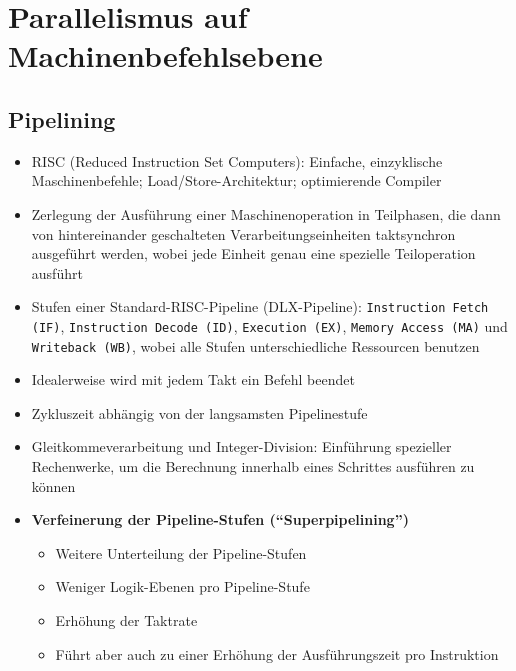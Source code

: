 \section{Parallelismus auf Machinenbefehlsebene}

\subsection{Pipelining}
\begin{itemize}
	\item RISC (Reduced Instruction Set Computers): Einfache, einzyklische Maschinenbefehle; Load/Store-Architektur; optimierende Compiler
	\item Zerlegung der Ausführung einer Maschinenoperation in Teilphasen, die dann von hintereinander geschalteten Verarbeitungseinheiten taktsynchron ausgeführt werden, wobei jede Einheit genau eine spezielle Teiloperation ausführt
	\item Stufen einer Standard-RISC-Pipeline (DLX-Pipeline): \texttt{Instruction Fetch (IF)}, \texttt{Instruction Decode (ID)}, \texttt{Execution (EX)}, \texttt{Memory Access (MA)} und \texttt{Writeback (WB)}, wobei alle Stufen unterschiedliche Ressourcen benutzen
	\item Idealerweise wird mit jedem Takt ein Befehl beendet
	\item Zykluszeit abhängig von der langsamsten Pipelinestufe
	\item Gleitkommeverarbeitung und Integer-Division: Einführung spezieller Rechenwerke, um die Berechnung innerhalb eines Schrittes ausführen zu können
	\item \textbf{Verfeinerung der Pipeline-Stufen ("`Superpipelining"')}
	\begin{itemize}
		\item Weitere Unterteilung der Pipeline-Stufen
		\item Weniger Logik-Ebenen pro Pipeline-Stufe %
		\item Erhöhung der Taktrate
		\item Führt aber auch zu einer Erhöhung der Ausführungszeit pro Instruktion
	\end{itemize}
\end{itemize}

